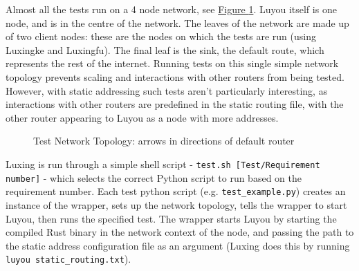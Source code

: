 \documentclass[12pt,a4paper,twoside,openany]{report}
\begin{document}
\bigskip

Almost all the tests run on a 4 node network, see \hyperref[fig::test_network]{Figure }\ref{fig::test_network}.  Luyou itself is one node, and is in the centre of the network.  The leaves of the network are made up of two client nodes: these are the nodes on which the tests are run (using Luxingke and Luxingfu).  The final leaf is the sink, the default route, which represents the rest of the internet.  Running tests on this single simple network topology prevents scaling and interactions with other routers from being tested. However, with static addressing such tests aren't particularly interesting, as interactions with other routers are predefined in the static routing file, with the other router appearing to Luyou as a node with more addresses.


\begin{figure}
\centering
{}
\caption{Test Network Topology: arrows in directions of default router}
\label{fig::test_network}
\end{figure}

\bigskip

Luxing is run through a simple shell script - \verb!test.sh [Test/Requirement number]! - which selects the correct Python script to run based on the requirement number. Each test python script (e.g. \verb!test_example.py!) creates an instance of the wrapper, sets up the network topology, tells the wrapper to start Luyou, then runs the specified test. The wrapper starts Luyou by starting the compiled Rust binary in the network context of the node, and passing the path to the static address configuration file as an argument (Luxing does this by running \verb!luyou static_routing.txt!).

\bigskip
\end{document}
